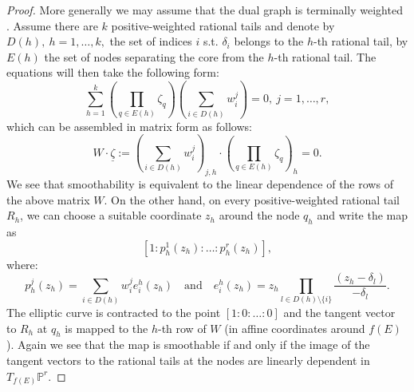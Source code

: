 \documentclass[11pt]{amsart}
\newcommand{\PP}{\mathbb P}
\renewcommand{\to}{\rightarrow}
\newcommand{\bcd}{\begin{center}\begin{tikzcd}}
\newcommand{\ecd}{\end{tikzcd}\end{center}}
\theoremstyle{plain}
\theoremstyle{definition}
\begin{document}
\begin{proof}
 More generally we may assume that the dual graph is terminally weighted \cite[\S 3.1]{HL}. Assume there are $k$ positive-weighted rational tails and denote by $D(h),\ h=1,\ldots,k,$ the set of indices $i$ s.t. $\delta_i$ belongs to the $h$-th rational tail, by $E(h)$ the set of nodes separating the core from the $h$-th rational tail. The equations will then take the following form:
 $$\sum_{h=1}^k\left(\prod_{q\in E(h)}\zeta_q\right)\left(\sum_{i\in D(h)}w_i^j\right)=0,\ j=1,\ldots,r,$$
 which can be assembled in matrix form as follows:
 $$W\cdot\underline\zeta:=\left(\sum_{i\in D(h)}w_i^j\right)_{j,h}\cdot\left(\prod_{q\in E(h)}\zeta_q\right)_h=0.$$
 We see that smoothability is equivalent to the linear dependence of the rows of the above matrix $W$. On the other hand, on every positive-weighted rational tail $R_h$, we can choose a suitable coordinate $z_h$ around the node $q_h$ and write the map as $$[1:p_h^1(z_h):\ldots:p_h^r(z_h)],$$ where: \[p_h^j(z_h)=\sum_{i\in D(h)}w_i^je_i^h(z_h) \quad \text{and} \quad e_i^h(z_h)=z_h\prod_{l\in D(h)\setminus\{i\}}\frac{(z_h-\delta_l)}{-\delta_l}.\] The elliptic curve is contracted to the point $[1:0:\ldots:0]$ and the tangent vector to $R_h$ at $q_h$ is mapped to the $h$-th row of $W$ (in affine coordinates around $f(E)$). Again we see that the map is smoothable if and only if the image of the tangent vectors to the rational tails at the nodes are linearly dependent in $T_{f(E)}\PP^r$.

\end{proof}
\end{document}
